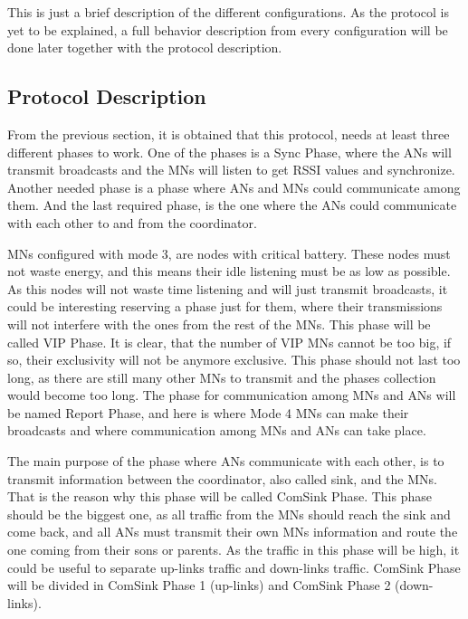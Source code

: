 This is just a brief description of the different configurations. As the protocol is yet to be explained, a full behavior description from 
every configuration will be done later together with the protocol description.

\subsection{Protocol Description}

From the previous section, it is obtained that this protocol, needs at least three different phases to work. One of the phases is a Sync 
Phase, where the \acp{AN} will transmit broadcasts and the \acp{MN} will listen to get \ac{RSSI} values and synchronize. Another needed 
phase is a phase where \acp{AN} and \acp{MN} could communicate among them. And the last required phase, is the one where the \acp{AN} could 
communicate with each other to and from the coordinator.

\acp{MN} configured with mode 3, are nodes with critical battery. These nodes must not waste energy, and this means their idle listening must be
as low as possible. As this nodes will not waste time listening and will just transmit broadcasts, it could be interesting reserving a phase
just for them, where their transmissions will not interfere with the ones from the rest of the \acp{MN}. This phase will be called \ac{VIP} 
Phase. It is clear, that the number of \ac{VIP} \acp{MN} cannot be too big, if so, their exclusivity will not be anymore exclusive.
This phase should not last too long, as there are still many other \acp{MN} to transmit and the phases collection would become too long.
The phase for communication among \acp{MN} and \acp{AN} will be named Report Phase, and here is where Mode 4 \acp{MN} can make 
their broadcasts and where communication among \acp{MN} and \acp{AN} can take place.

The main purpose of the phase where \acp{AN} communicate with each other, is to transmit information between the coordinator, also called sink, and 
the \acp{MN}. That is the reason why this phase will be called ComSink Phase. This phase should be the biggest one, as all traffic from 
the \acp{MN} should reach the sink and come back, and all \acp{AN} must transmit their own \acp{MN} information and route the one coming from
their sons or parents. As the traffic in this phase will be high, it could be useful to separate up-links traffic and down-links traffic. 
ComSink Phase will be divided in ComSink Phase 1 (up-links) and ComSink Phase 2 (down-links).

